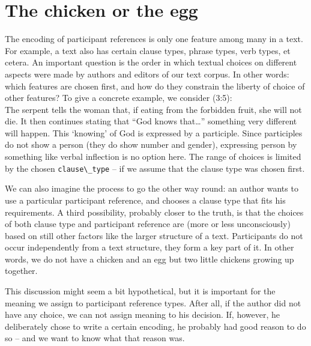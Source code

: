 \documentclass{report}
\newcommand{\mi}[1]{\lstinline{#1}}
\newcommand{\hebr}[1]{\hbox{\cjRL{#1}}}
\begin{document}
\section{The chicken or the egg}\label{chicken}
The encoding of participant references is only one feature among many in a text. For example, a text also has certain clause types, phrase types, verb types, et cetera.
An important question is the order in which textual choices on different aspects were made by authors and editors of our text corpus. In other words: which features are chosen first, and how do they constrain the liberty of choice of other features?
To give a concrete example, we consider (3:5): \hebr{KJ JD< >LHJM KJ} \\
The serpent tells the woman that, if eating from the forbidden fruit, she will not die. It then continues stating that ``God knows that\ldots'' something very different will happen. This `knowing' of God is expressed by a participle. Since participles do not show a person (they do show number and gender), expressing person by something like verbal inflection is no option here. The range of choices is limited by the chosen \mi{clause\_type} -- if we assume that the clause type was chosen first.

We can also imagine the process to go the other way round: an author wants to use a particular participant reference, and chooses a clause type that fits his requirements.
A third possibility, probably closer to the truth, is that the choices of both clause type and participant reference are (more or less unconsciously) based on still other factors like the larger structure of a text. Participants do not occur independently from a text structure, they form a key part of it. In other words, we do not have a chicken and an egg but two little chickens growing up together.

This discussion might seem a bit hypothetical, but it is important for the meaning we assign to participant reference types. After all, if the author did not have any choice, we can not assign meaning to his decision. If, however, he deliberately chose to write a certain encoding, he probably had good reason to do so -- and we want to know what that reason was.
\end{document}
